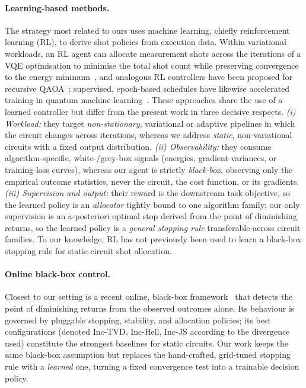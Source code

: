 \documentclass[runningheads]{llncs}
\begin{document}
\paragraph{Learning-based methods.} The strategy most related to ours uses
machine learning, chiefly reinforcement learning (RL), to derive shot
policies from execution data. Within variational workloads, an RL agent can
allocate measurement shots across the iterations of a VQE optimisation to
minimise the total shot count while preserving convergence to the energy
minimum~\cite{liang2024shotreduction}, and analogous RL controllers have been
proposed for recursive QAOA~\cite{rqaoa2026rlshots}; supervised, epoch-based
schedules have likewise accelerated training in quantum machine
learning~\cite{phalak2023shot}. These approaches share the use of a learned
controller but differ from the present work in three decisive respects.
\emph{(i) Workload:} they target \emph{non-stationary}, variational or
adaptive pipelines in which the circuit changes across iterations, whereas we
address \emph{static}, non-variational circuits with a fixed output
distribution. \emph{(ii) Observability:} they consume algorithm-specific,
white-/grey-box signals (energies, gradient variances, or training-loss
curves), whereas our agent is strictly \emph{black-box}, observing only the
empirical outcome statistics, never the circuit, the cost function, or its
gradients. \emph{(iii) Supervision and output:} their reward is the downstream
task objective, so the learned policy is an \emph{allocator} tightly bound to
one algorithm family; our only supervision is an a-posteriori optimal stop
derived from the point of diminishing returns, so the learned policy is a
\emph{general stopping rule} transferable across circuit families. To our
knowledge, RL has not previously been used to learn a black-box stopping rule
for static-circuit shot allocation.

\paragraph{Online black-box control.} Closest to our setting is a recent online,
black-box framework~\cite{bisicchia2026shots} that detects the point of
diminishing returns from the observed outcomes alone. Its behaviour is governed
by pluggable stopping, stability, and allocation policies; its best
configurations (denoted \mbox{Inc-TVD}, \mbox{Inc-Hell}, \mbox{Inc-JS}
according to the divergence used) constitute the strongest baselines for static
circuits. Our work keeps the same black-box assumption but replaces the
hand-crafted, grid-tuned stopping rule with a \emph{learned} one, turning a
fixed convergence test into a trainable decision policy.
\end{document}
